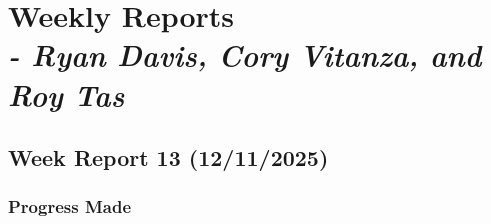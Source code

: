 \chapter{Weekly Reports \\
\small{\textit{- Ryan Davis, Cory Vitanza, and Roy Tas}}%
}
\label{Chapter::WeeklyReports}

\section{Week Report 13 (12/11/2025)}
\label{sec:report13}

\subsection{Progress Made}
